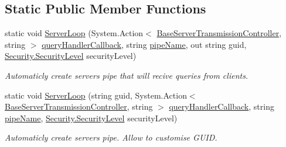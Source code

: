 \subsection*{Static Public Member Functions}
\begin{DoxyCompactItemize}
\item 
static void \mbox{\hyperlink{class_pipes_provider_1_1_server_1_1_transmission_controllers_1_1_client_to_server_transmission_controller_a9e11d59cc7f44eee700d002df9d4f580}{Server\+Loop}} (System.\+Action$<$ \mbox{\hyperlink{class_pipes_provider_1_1_server_1_1_transmission_controllers_1_1_base_server_transmission_controller}{Base\+Server\+Transmission\+Controller}}, string $>$ \mbox{\hyperlink{class_pipes_provider_1_1_server_1_1_transmission_controllers_1_1_client_to_server_transmission_controller_a7f1552d5fea75a49edc81af944630f3e}{query\+Handler\+Callback}}, string \mbox{\hyperlink{class_pipes_provider_1_1_server_1_1_transmission_controllers_1_1_base_server_transmission_controller_a4ce9911f1ad6814d3e5c9096d9ddde57}{pipe\+Name}}, out string guid, \mbox{\hyperlink{namespace_pipes_provider_1_1_security_a1a6020eca1c661a6f7140e8260502d7e}{Security.\+Security\+Level}} security\+Level)
\begin{DoxyCompactList}\small\item\em Automaticly create server\textquotesingle{}s pipe that will recive queries from clients. \end{DoxyCompactList}\item 
static void \mbox{\hyperlink{class_pipes_provider_1_1_server_1_1_transmission_controllers_1_1_client_to_server_transmission_controller_ab52c0b0e04e34cd795847eef1e59d35b}{Server\+Loop}} (string guid, System.\+Action$<$ \mbox{\hyperlink{class_pipes_provider_1_1_server_1_1_transmission_controllers_1_1_base_server_transmission_controller}{Base\+Server\+Transmission\+Controller}}, string $>$ \mbox{\hyperlink{class_pipes_provider_1_1_server_1_1_transmission_controllers_1_1_client_to_server_transmission_controller_a7f1552d5fea75a49edc81af944630f3e}{query\+Handler\+Callback}}, string \mbox{\hyperlink{class_pipes_provider_1_1_server_1_1_transmission_controllers_1_1_base_server_transmission_controller_a4ce9911f1ad6814d3e5c9096d9ddde57}{pipe\+Name}}, \mbox{\hyperlink{namespace_pipes_provider_1_1_security_a1a6020eca1c661a6f7140e8260502d7e}{Security.\+Security\+Level}} security\+Level)
\begin{DoxyCompactList}\small\item\em Automaticly create server\textquotesingle{}s pipe. Allow to customise G\+U\+ID. \end{DoxyCompactList}\item 

\end{DoxyCompactItemize}
